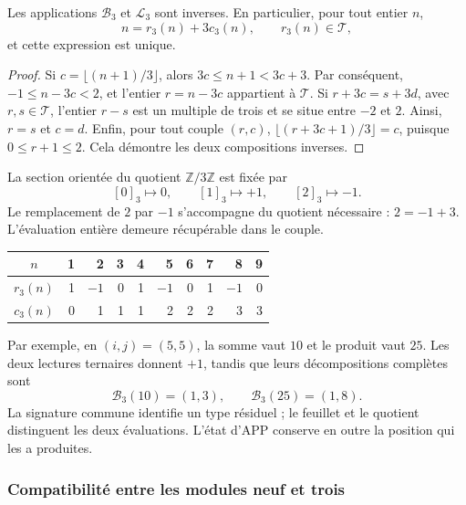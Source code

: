 \begin{proposicion}
\label{trit:prop:restitucion}
Les applications \(\mathcal B_3\) et \(\mathcal L_3\) sont inverses.
En particulier, pour tout entier \(n\),
\[
 n=r_3(n)+3c_3(n),\qquad r_3(n)\in\mathcal T,
\]
et cette expression est unique.
\end{proposicion}
\begin{proof}
Si \(c=\lfloor(n+1)/3\rfloor\), alors
\(3c\le n+1<3c+3\). Par conséquent, \(-1\le n-3c<2\), et l'entier
\(r=n-3c\) appartient à \(\mathcal T\). Si
\(r+3c=s+3d\), avec \(r,s\in\mathcal T\), l'entier \(r-s\) est un multiple
de trois et se situe entre \(-2\) et \(2\). Ainsi, \(r=s\) et \(c=d\).
Enfin, pour tout couple \((r,c)\),
\(\lfloor(r+3c+1)/3\rfloor=c\), puisque \(0\le r+1\le2\).
Cela démontre les deux compositions inverses.
\end{proof}

La section orientée du quotient \(\mathbb Z/3\mathbb Z\) est fixée par
\[
 [0]_3\longmapsto0,\qquad [1]_3\longmapsto+1,
 \qquad [2]_3\longmapsto-1.
\]
Le remplacement de \(2\) par \(-1\) s'accompagne du quotient nécessaire :
\(2=-1+3\). L'évaluation entière demeure récupérable dans le couple.

\begin{tablacompleta}
\caption{Décomposition équilibrée des neuf positions d'une droite APP.}
\label{trit:tabla:nueve}
\begin{tabular}{c*{9}{r}}
\toprule
\(n\)&1&2&3&4&5&6&7&8&9\\
\midrule
\(r_3(n)\)&1&$-1$&0&1&$-1$&0&1&$-1$&0\\
\(c_3(n)\)&0&1&1&1&2&2&2&3&3\\
\bottomrule
\end{tabular}
\end{tablacompleta}

Par exemple, en \((i,j)=(5,5)\), la somme vaut \(10\) et le produit vaut
\(25\). Les deux lectures ternaires donnent \(+1\), tandis que leurs
décompositions complètes sont
\[
 \mathcal B_3(10)=(1,3),\qquad
 \mathcal B_3(25)=(1,8).
\]
La signature commune identifie un type résiduel ; le feuillet et le quotient distinguent
les deux évaluations. L'état d'APP conserve en outre la position qui les
a produites.

\subsubsection{Compatibilité entre les modules neuf et trois}

